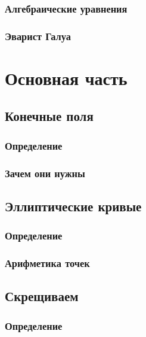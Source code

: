 \documentclass[aspectratio=169]{beamer}
\begin{document}
      \subsubsection{Алгебраические уравнения}
          
      \subsubsection{Эварист Галуа}
          

  \section{Основная часть}
    \subsection{Конечные поля}
      \subsubsection{Определение}
        
        
        
      \subsubsection{Зачем они нужны}
        
    \subsection{Эллиптические кривые}
      \subsubsection{Определение}
        
      \subsubsection{Арифметика точек}
        
        
        
    \subsection{Скрещиваем}
      \subsubsection{Определение}
        
        
\end{document}
